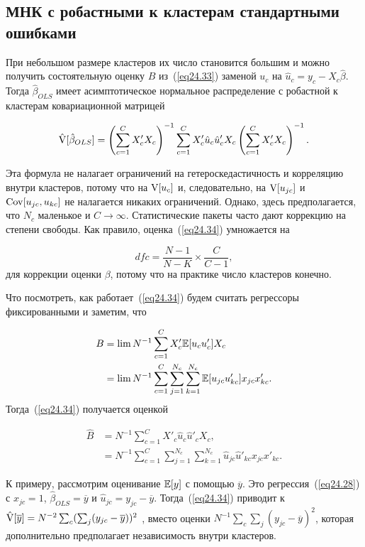 \subsection*{МНК с робастными к кластерам стандартными ошибками}

При небольшом размере кластеров их число становится большим и можно получить состоятельную оценку $B$ из~(\ref{eq24.33}) заменой $u_c$ на $\hat u_c = y_c - X_c \hat \beta$. Тогда $\hat \beta_{OLS}$ имеет асимптотическое нормальное распределение с робастной к кластерам ковариационной матрицей

\begin{equation}
\label{eq24.34}
\hat {\mathrm{V}} [\hat \beta_{OLS}] = \left( \sum_{c=1}^C X'_c X_c \right)^{-1} \sum_{c=1}^C X'_c \hat u_c \hat u'_c X_c \left( \sum_{c=1}^C X'_c X_c \right)^{-1}. 
\end{equation}

Эта формула не налагает ограничений на гетероскедастичность и корреляцию внутри кластеров, потому что на $\mathrm{V}[u_c]$ и, следовательно, на $\mathrm{V}[u_{jc}]$ и $\mathrm{Cov}[u_{jc}, u_{kc}]$ не налагается никаких ограничений. Однако, здесь предполагается, что $N_c$ маленькое и $C \to \infty$. Статистические пакеты часто дают коррекцию на степени свободы. Как правило, оценка~(\ref{eq24.34}) умножается на

$$
dfc = \frac{N-1}{N-K} \times \frac{C}{C-1},
$$
для коррекции оценки $\beta$, потому что на практике число кластеров конечно. 

Что посмотреть, как работает~(\ref{eq24.34}) будем считать регрессоры фиксированными и заметим, что

\begin{align}
B & = \lim N^{-1} \sum_{c=1}^C X'_c \mathbb{E}[u_c u'_c] X_c \nonumber\\
& = \lim N^{-1} \sum_{c=1}^C \sum_{j=1}^{N_c} \sum_{k=1}^{N_c} \mathbb{E}[u_{jc}u'_{kc}] x_{jc} x'_{kc}. \nonumber
\end{align}
Тогда~(\ref{eq24.34}) получается оценкой

\begin{align}
\hat{B} & =  N^{-1} \sum_{c=1}^C X'_c \hat u_c \hat u'_c X_c, \nonumber\\
& =  N^{-1} \sum_{c=1}^C \sum_{j=1}^{N_c} \sum_{k=1}^{N_c} \hat u_{jc} \hat u'_{kc} x_{jc} x'_{kc}. \nonumber
\end{align}

К примеру, рассмотрим оценивание $\mathbb{E}[y]$ с помощью $\overline{y}$. Это регрессия~(\ref{eq24.28}) с $x_{jc}=1$, $\hat \beta_{OLS} = \overline{y}$ и $\hat u_{jc} = y_{jc} - \overline{y}$. Тогда~(\ref{eq24.34}) приводит к $\hat {\mathrm{V}}[\overline{y}] = N^{-2} \sum_c (\sum_j (y_{jc} - \overline{y}))^2$ , вместо оценки $N^{-1} \sum_c \sum_j (y_{jc} - \overline{y})^2$, которая дополнительно предполагает независимость внутри кластеров. 

